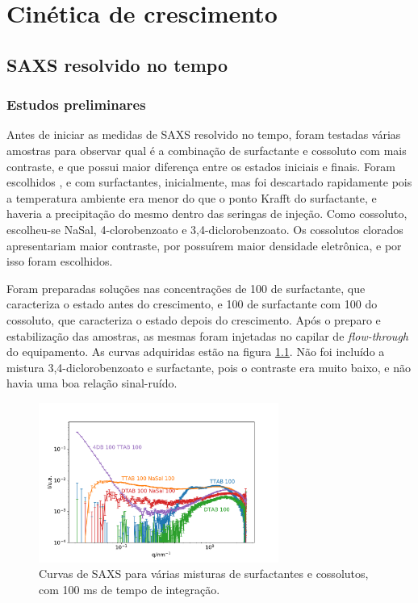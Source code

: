 	
\part{Cinética de crescimento}
	\chapter{SAXS resolvido no tempo}
	
	\section{Estudos preliminares}
	Antes de iniciar as medidas de SAXS resolvido no tempo, foram testadas várias amostras para observar qual é a combinação de surfactante e cossoluto com mais contraste, e que possui maior diferença entre os estados iniciais e finais. Foram escolhidos \CTAB, \TTAB{} e \DTAB{} com surfactantes, inicialmente, mas \CTAB{} foi descartado rapidamente pois a temperatura ambiente era menor do que o ponto Krafft do surfactante, e haveria a precipitação do mesmo dentro das seringas de injeção. Como cossoluto, escolheu-se NaSal, 4-clorobenzoato e 3,4-diclorobenzoato. Os cossolutos clorados apresentariam maior contraste, por possuírem maior densidade eletrônica, e por isso foram escolhidos.
	
	Foram preparadas soluções nas concentrações de 100 \mM{} de surfactante, que caracteriza o estado antes do crescimento, e 100 \mM{} de surfactante com 100 \mM{} do cossoluto, que caracteriza o estado depois do crescimento. Após o preparo e estabilização das amostras, as mesmas foram injetadas no capilar de \emph{flow-through} do equipamento. As curvas adquiridas estão na figura \ref{fig:ft_preliminar}. Não foi incluído a mistura 3,4-diclorobenzoato e surfactante, pois o contraste era muito baixo, e não havia uma boa relação sinal-ruído.
	
	\begin{figure}[h]
		\centering
		\includegraphics[width=0.7\textwidth]{imagens/saxs/FT_amostras}
		\caption{Curvas de SAXS para várias misturas de surfactantes e cossolutos, com 100 ms de tempo de integração.}
		\label{fig:ft_preliminar}
	\end{figure}

